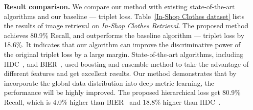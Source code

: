 \documentclass[runningheads]{llncs}
\begin{document}
\noindent\textbf{Result comparison.} We compare our method with existing state-of-the-art algorithms and our baseline --- triplet loss. Table~\ref{In-Shop Clothes dataset} lists the results of image retrieval on \emph{In-Shop Clothes Retrieval}. The proposed method achieves 80.9\% Recall, and outperforms the baseline algorithm --- triplet loss by 18.6\%. It indicates that our algorithm can improve the discriminative power of the original triplet loss by a large margin. State-of-the-art algorithms, including HDC~\cite{Yuan_2017_ICCV}, and BIER~\cite{opitz2017bier}, used boosting and ensemble method to take the advantage of different features and get excellent results. Our method demonstrates that by incorporate the global data distribution into deep metric learning, the performance will be highly improved. The proposed hierarchical loss get 80.9\% Recall, which is 4.0\% higher than BIER~\cite{opitz2017bier} and 18.8\% higher than HDC~\cite{Yuan_2017_ICCV}.
\end{document}
